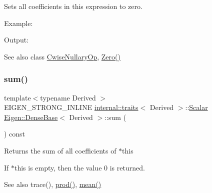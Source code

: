 Sets all coefficients in this expression to zero.

Example\+: 
\begin{DoxyCodeInclude}{0}
\end{DoxyCodeInclude}
 Output\+: 
\begin{DoxyVerbInclude}
\end{DoxyVerbInclude}


\begin{DoxySeeAlso}{See also}
class \mbox{\hyperlink{class_eigen_1_1_cwise_nullary_op}{Cwise\+Nullary\+Op}}, \mbox{\hyperlink{class_eigen_1_1_dense_base_a8c4be762b10041d64a2b2ce85bb14ba0}{Zero()}} 
\end{DoxySeeAlso}
\mbox{\label{class_eigen_1_1_dense_base_a4dee689c76ff86da9d8e49950604597b}} 
\subsubsection{\texorpdfstring{sum()}{sum()}}
{\footnotesize\ttfamily template$<$typename Derived $>$ \\
E\+I\+G\+E\+N\+\_\+\+S\+T\+R\+O\+N\+G\+\_\+\+I\+N\+L\+I\+NE \mbox{\hyperlink{struct_eigen_1_1internal_1_1traits}{internal\+::traits}}$<$ Derived $>$\+::\mbox{\hyperlink{class_eigen_1_1_dense_base_a5feed465b3a8e60c47e73ecce83e39a2}{Scalar}} \mbox{\hyperlink{class_eigen_1_1_dense_base}{Eigen\+::\+Dense\+Base}}$<$ Derived $>$\+::sum (\begin{DoxyParamCaption}{ }\end{DoxyParamCaption}) const}

\begin{DoxyReturn}{Returns}
the sum of all coefficients of {\ttfamily $\ast$this} 
\end{DoxyReturn}
If {\ttfamily $\ast$this} is empty, then the value 0 is returned.

\begin{DoxySeeAlso}{See also}
trace(), \mbox{\hyperlink{class_eigen_1_1_dense_base_a175ceb201923b4c6767770559e47e40e}{prod()}}, \mbox{\hyperlink{class_eigen_1_1_dense_base_a89d85ac0cf349eb53481c148033459d7}{mean()}} 
\end{DoxySeeAlso}
\mbox{\label{class_eigen_1_1_dense_base_ab420d9d588ac443f5a1b1a7dceb12c90}} 

